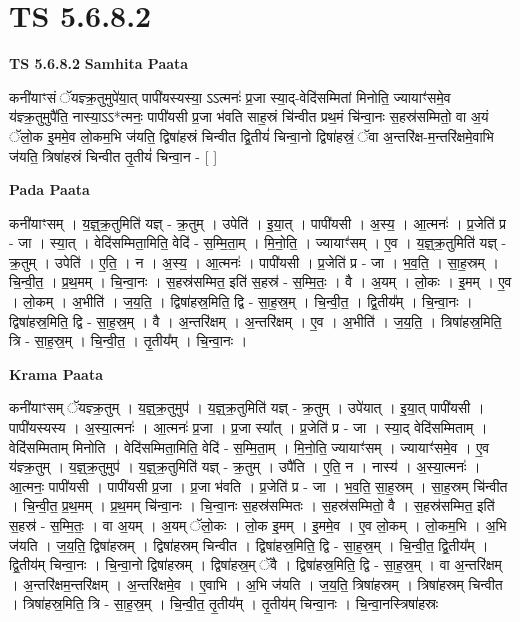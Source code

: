 \documentclass[17pt]{extarticle}
\begin{document}
\section{ TS 5.6.8.2 }

\textbf{TS 5.6.8.2 } \newline
\textbf{Samhita Paata} \newline

कनी॑याꣳसं ॅयज्ञ्क्र॒तुमुपे॑या॒त् पापी॑यस्यस्या॒ ऽऽत्मनः॑ प्र॒जा स्या॒द्-वेदि॑सम्मितां मिनोति॒ ज्यायाꣳ॑समे॒व य॑ज्ञ्क्र॒तुमुपै॑ति॒ नास्या॒ऽऽ*त्मनः॒ पापी॑यसी प्र॒जा भ॑वति साह॒स्रं चि॑न्वीत प्रथ॒मं चि॑न्वा॒नः स॒हस्र॑सम्मितो॒ वा अ॒यं ॅलो॒क इ॒ममे॒व लो॒कम॒भि ज॑यति॒ द्विषा॑हस्रं चिन्वीत द्वि॒तीयं॑ चिन्वा॒नो द्विषा॑हस्रं॒ ॅवा अ॒न्तरि॑क्ष-म॒न्तरि॑क्षमे॒वाभि ज॑यति॒ त्रिषा॑हस्रं चिन्वीत तृ॒तीयं॑ चिन्वा॒न - [  ] \newline

\textbf{Pada Paata} \newline

कनी॑याꣳसम् । य॒ज्ञ्॒क्र॒तुमिति॑ यज्ञ् - क्र॒तुम् । उपेति॑ । इ॒या॒त् । पापी॑यसी । अ॒स्य॒ । आ॒त्मनः॑ । प्र॒जेति॑ प्र - जा । स्या॒त् । वेदि॑सम्मिता॒मिति॒ वेदि॑ - स॒म्मि॒ता॒म् । मि॒नो॒ति॒ । ज्यायाꣳ॑सम् । ए॒व । य॒ज्ञ्॒क्र॒तुमिति॑ यज्ञ् - क्र॒तुम् । उपेति॑ । ए॒ति॒ । न । अ॒स्य॒ । आ॒त्मनः॑ । पापी॑यसी । प्र॒जेति॑ प्र - जा । भ॒व॒ति॒ । सा॒ह॒स्रम् । चि॒न्वी॒त॒ । प्र॒थ॒मम् । चि॒न्वा॒नः । स॒हस्र॑सम्मित॒ इति॑ स॒हस्र॑ - स॒म्मि॒तः॒ । वै । अ॒यम् । लो॒कः ।   इ॒मम् । ए॒व । लो॒कम् । अ॒भीति॑ । ज॒य॒ति॒ । द्विषा॑हस्र॒मिति॒ द्वि - सा॒ह॒स्र॒म् । चि॒न्वी॒त॒ । द्वि॒तीय᳚म् । चि॒न्वा॒नः । द्विषा॑हस्र॒मिति॒ द्वि - सा॒ह॒स्र॒म् । वै । अ॒न्तरि॑क्षम् । अ॒न्तरि॑क्षम् । ए॒व । अ॒भीति॑ । ज॒य॒ति॒ । त्रिषा॑हस्र॒मिति॒ त्रि - सा॒ह॒स्र॒म् । चि॒न्वी॒त॒ । तृ॒तीय᳚म् । चि॒न्वा॒नः ।  \newline


\textbf{Krama Paata} \newline

कनी॑याꣳसम् ॅयज्ञ्क्र॒तुम् । य॒ज्ञ्॒क्र॒तुमुप॑ । य॒ज्ञ्॒क्र॒तुमिति॑ यज्ञ् - क्र॒तुम् । उपे॑यात् । इ॒या॒त् पापी॑यसी । पापी॑यस्यस्य । अ॒स्या॒त्मनः॑ । आ॒त्मनः॑ प्र॒जा । प्र॒जा स्या᳚त् । प्र॒जेति॑ प्र - जा । स्या॒द् वेदि॑सम्मिताम् । वेदि॑सम्मिताम् मिनोति । वेदि॑सम्मिता॒मिति॒ वेदि॑ - स॒म्मि॒ता॒म् । मि॒नो॒ति॒ ज्यायाꣳ॑सम् । ज्यायाꣳ॑समे॒व । ए॒व य॑ज्ञ्क्र॒तुम् । य॒ज्ञ्॒क्र॒तुमुप॑ । य॒ज्ञ्॒क्र॒तुमिति॑ यज्ञ् - क्र॒तुम् । उपै॑ति । ए॒ति॒ न । नास्य॑ । अ॒स्या॒त्मनः॑ । आ॒त्मनः॒ पापी॑यसी । पापी॑यसी प्र॒जा । प्र॒जा भ॑वति । प्र॒जेति॑ प्र - जा । भ॒व॒ति॒ सा॒ह॒स्रम् । सा॒ह॒स्रम् चि॑न्वीत । चि॒न्वी॒त॒ प्र॒थ॒मम् । प्र॒थ॒मम् चि॑न्वा॒नः । चि॒न्वा॒नः स॒हस्र॑सम्मितः । स॒हस्र॑सम्मितो॒ वै । स॒हस्र॑सम्मित॒ इति॑ स॒हस्र॑ - स॒म्मि॒तः॒ । वा अ॒यम् । अ॒यम् ॅलो॒कः । लो॒क इ॒मम् । इ॒ममे॒व । ए॒व लो॒कम् । लो॒कम॒भि । अ॒भि ज॑यति । ज॒य॒ति॒ द्विषा॑हस्रम् । द्विषा॑हस्रम् चिन्वीत । द्विषा॑हस्र॒मिति॒ द्वि - सा॒ह॒स्र॒म् । चि॒न्वी॒त॒ द्वि॒तीय᳚म् । द्वि॒तीय॑म् चिन्वा॒नः । चि॒न्वा॒नो द्विषा॑हस्रम् । द्विषा॑हस्र॒म् ॅवै । द्विषा॑हस्र॒मिति॒ द्वि - सा॒ह॒स्र॒म् । वा अ॒न्तरि॑क्षम् । अ॒न्तरि॑क्षम॒न्तरि॑क्षम् । अ॒न्तरि॑क्षमे॒व । ए॒वाभि । अ॒भि ज॑यति । ज॒य॒ति॒ त्रिषा॑हस्रम् । त्रिषा॑हस्रम् चिन्वीत । त्रिषा॑हस्र॒मिति॒ त्रि - सा॒ह॒स्र॒म् । चि॒न्वी॒त॒ तृ॒तीय᳚म् । तृ॒तीय॑म् चिन्वा॒नः । चि॒न्वा॒नस्त्रिषा॑हस्रः \newline
\end{document}
